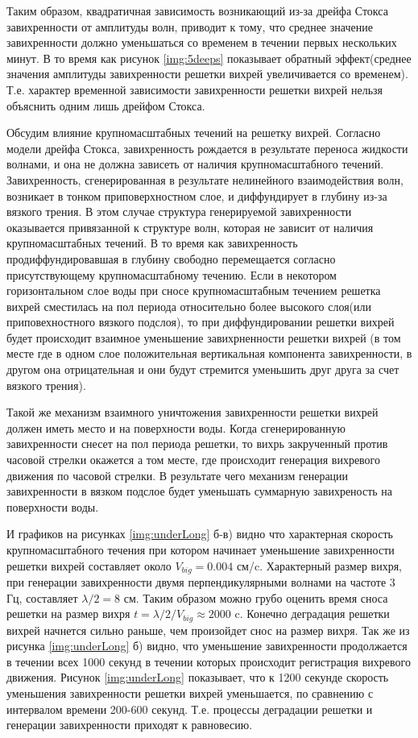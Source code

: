 Таким образом, квадратичная зависимость возникающий из-за дрейфа Стокса завихренности от амплитуды волн, приводит к тому, что среднее значение завихренности должно уменьшаться со временем в течении первых нескольких минут. В то время как рисунок \ref{img:5deeps} показывает обратный эффект(среднее значения амплитуды завихренности решетки вихрей увеличивается со временем). Т.е. характер временной зависимости завихренности решетки вихрей нельзя объяснить одним лишь дрейфом Стокса. 




Обсудим влияние крупномасштабных течений на решетку вихрей.
Согласно модели дрейфа Стокса, завихренность рождается в результате переноса жидкости волнами, и она не должна зависеть от наличия крупномасштабного течений.  Завихренность, сгенерированная в результате нелинейного взаимодействия волн, возникает в тонком приповерхностном слое, и диффундирует в глубину из-за вязкого трения. В этом случае структура генерируемой завихренности оказывается привязанной к структуре волн, которая не зависит от наличия крупномасштабных течений. В то время как завихренность продиффундировавшая в глубину свободно перемещается согласно присутствующему крупномасштабному течению. Если в некотором горизонтальном слое воды при сносе крупномасштабным течением решетка вихрей сместилась на пол периода относительно более высокого слоя(или приповехностного вязкого подслоя), то при диффундировании решетки вихрей будет происходит взаимное уменьшение завихрненности решетки вихрей (в том месте где в одном слое положительная вертикальная компонента завихренности, в другом она отрицательная и они будут стремится уменьшить друг друга за счет вязкого трения). 

Такой же механизм взаимного уничтожения завихренности решетки вихрей должен иметь место и на поверхности воды. Когда сгенерированную завихренности снесет на пол периода решетки, то вихрь закрученный против часовой стрелки окажется а том месте, где происходит генерация вихревого движения по часовой стрелки. В результате чего механизм генерации завихренности в вязком подслое будет уменьшать суммарную завихреность на поверхности воды.

И графиков на рисунках \ref{img:underLong} б-в) видно что характерная скорость крупномасштабного течения при котором начинает уменьшение завихренности решетки вихрей составляет около $V_{big} = 0.004$ см/c. Характерный размер вихря, при генерации завихренности двумя перпендикулярными волнами на частоте 3 Гц, составляет $\lambda/2 = 8$ см. Таким образом можно грубо оценить время сноса решетки на размер вихря $t=\lambda/2/V_{big} \approx 2000$ c. Конечно деградация решетки вихрей начнется сильно раньше, чем произойдет снос на размер вихря. Так же из рисунка \ref{img:underLong} б) видно, что уменьшение завихренности продолжается в течении всех 1000 секунд в течении которых происходит регистрация вихревого движения. Рисунок \ref{img:underLong} показывает, что к 1200 секунде скорость уменьшения завихренности решетки вихрей уменьшается, по сравнению с интервалом времени 200-600 секунд. Т.е. процессы деградации решетки и генерации завихренности приходят к равновесию.

